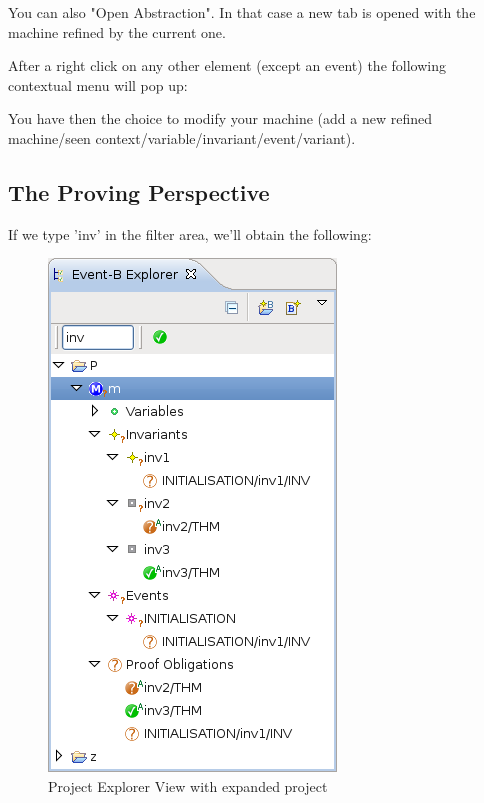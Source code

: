 You can also "Open Abstraction". In that case a new tab is opened with the machine refined by the current one.

After a right click on any other element (except an event) the following contextual menu will pop up:


You have then the choice to modify your machine (add a new refined machine/seen context/variable/invariant/event/variant). 

\subsection{The Proving Perspective}
\label{ref_01_proving_perspective}

If we type 'inv' in the filter area, we'll obtain the following:

\begin{figure}[!h]
\begin{center}
	\includegraphics{img/reference/ref_01_project_explorer5.png}
	\caption{Project Explorer View with expanded project}
	\label{fig_ref_01_project_explorer5}
\end{center}
\end{figure}

